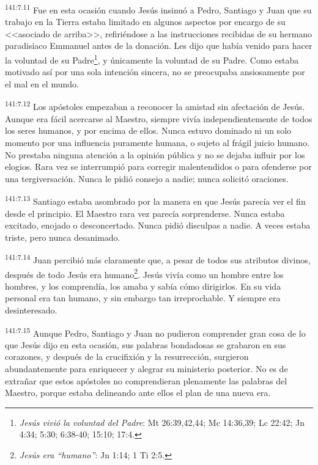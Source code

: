 \par 
\textsuperscript{141:7.11} Fue en esta ocasión cuando Jesús insinuó a Pedro, Santiago y Juan que su trabajo en la Tierra estaba limitado en algunos aspectos por encargo de su <<asociado de arriba>>, refiriéndose a las instrucciones recibidas de su hermano paradisiaco Emmanuel antes de la donación. Les dijo que había venido para hacer la voluntad de su Padre\footnote{\textit{Jesús vivió la voluntad del Padre}: Mt 26:39,42,44; Mc 14:36,39; Lc 22:42; Jn 4:34; 5:30; 6:38-40; 15:10; 17:4.}, y únicamente la voluntad de su Padre. Como estaba motivado así por una sola intención sincera, no se preocupaba ansiosamente por el mal en el mundo.

\par 
\textsuperscript{141:7.12} Los apóstoles empezaban a reconocer la amistad sin afectación de Jesús. Aunque era fácil acercarse al Maestro, siempre vivía independientemente de todos los seres humanos, y por encima de ellos. Nunca estuvo dominado ni un solo momento por una influencia puramente humana, o sujeto al frágil juicio humano. No prestaba ninguna atención a la opinión pública y no se dejaba influir por los elogios. Rara vez se interrumpió para corregir malentendidos o para ofenderse por una tergiversación. Nunca le pidió consejo a nadie; nunca solicitó oraciones.

\par 
\textsuperscript{141:7.13} Santiago estaba asombrado por la manera en que Jesús parecía ver el fin desde el principio. El Maestro rara vez parecía sorprenderse. Nunca estaba excitado, enojado o desconcertado. Nunca pidió disculpas a nadie. A veces estaba triste, pero nunca desanimado.

\par 
\textsuperscript{141:7.14} Juan percibió más claramente que, a pesar de todos sus atributos divinos, después de todo Jesús era humano\footnote{\textit{Jesús era ``humano''}: Jn 1:14; 1 Ti 2:5.}. Jesús vivía como un hombre entre los hombres, y los comprendía, los amaba y sabía cómo dirigirlos. En su vida personal era tan humano, y sin embargo tan irreprochable. Y siempre era desinteresado.

\par 
\textsuperscript{141:7.15} Aunque Pedro, Santiago y Juan no pudieron comprender gran cosa de lo que Jesús dijo en esta ocasión, sus palabras bondadosas se grabaron en sus corazones, y después de la crucifixión y la resurrección, surgieron abundantemente para enriquecer y alegrar su ministerio posterior. No es de extrañar que estos apóstoles no comprendieran plenamente las palabras del Maestro, porque estaba delineando ante ellos el plan de una nueva era.

